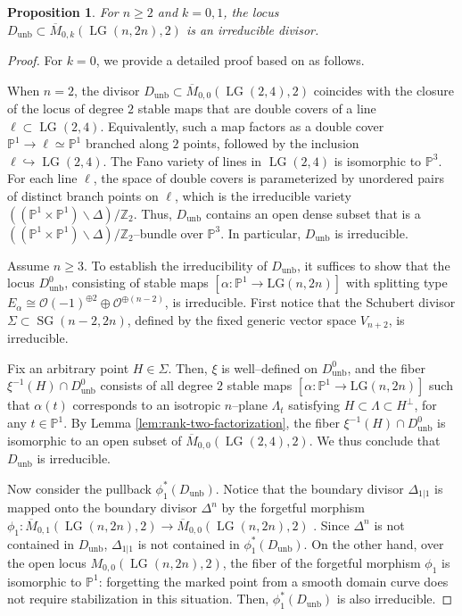 \documentclass[10pt]{amsart}
\newtheorem{proposition}[theorem]{Proposition}
\theoremstyle{definition}
\newcommand{\Mbar}{\overline{M}}
\newcommand{\LG}{\operatorname{LG}}
\DeclareMathOperator{\unb}{unb}
\newcommand{\PP}{\mathbb{P}}
\theoremstyle{plain} %
\begin{document}
\begin{proposition}\label{prop:Dunb-divisor}
For \(n\ge 2\) and $k=0,1$, the locus \(D_{\unb}\subset \overline{M}_{0,k}(\LG(n,2n),2)\) is an irreducible divisor.
\end{proposition}
\begin{proof}
For \(k=0\), we provide a detailed proof based on  \cite[Section~6]{CM} as follows.



When \(n=2\), the divisor \(D_{\unb}\subset \overline{M}_{0,0}(\LG(2,4),2)\) coincides with the
closure of the locus of degree \(2\) stable maps that are double covers of a line
\(\ell\subset \LG(2,4)\). Equivalently, such a map factors as a double cover
\(\mathbb P^1\to \ell\simeq \mathbb P^1\) branched along $2$ points, followed by the inclusion \(\ell\hookrightarrow \LG(2,4)\). The Fano variety of lines in  $\LG(2,4)$ is isomorphic to $\mathbb P^3$. 
For each line $\ell$,
the space of double covers is parameterized by unordered pairs of distinct branch points on $\ell$, which is the irreducible variety 
$((\mathbb P^1\times\mathbb P^1)\backslash\Delta)/\mathbb Z_2$. Thus, $D_{\unb}$ contains an open dense subset that is a  $((\mathbb P^1\times\mathbb P^1)\backslash\Delta)/\mathbb Z_2$--bundle over $\mathbb P^3$.  In particular, $D_{\unb}$ is irreducible.


Assume $n \geq 3$. To establish the irreducibility of $D_{\unb}$, it suffices to show that the locus $D_{\unb}^0$, consisting of stable maps $[\alpha \colon \mathbb{P}^1 \to \mathrm{LG}(n,2n)]$ with splitting type $E_\alpha \cong \mathcal{O}(-1)^{\oplus 2} \oplus \mathcal{O}^{\oplus (n-2)}$, is irreducible. First notice that the Schubert divisor $\Sigma\subset\operatorname{SG}(n-2, 2n)$, defined by the fixed generic vector space $V_{n+2}$, is irreducible. 

Fix an arbitrary point $H \in \Sigma$. Then, $\xi$ is well--defined on $D_{\unb}^0$, and the fiber $\xi^{-1}(H)\cap D_{\unb}^0$ consists of all degree $2$ stable maps $[\alpha \colon \mathbb{P}^1 \to \mathrm{LG}(n,2n)]$ such that  $\alpha(t)$ corresponds to an isotropic $n$--plane $\Lambda_t$ satisfying $H \subset \Lambda \subset H^\perp$, for any $t\in\PP^1$.
By Lemma \ref{lem:rank-two-factorization}, the fiber $\xi^{-1}(H)\cap D_{\unb}^0$ is isomorphic to an open subset of $\Mbar_{0,0}(\LG(2, 4), 2)$. We thus conclude that $D_{\unb}$ is irreducible.

Now consider the pullback $\phi_1^*(D_{\unb})$. Notice that the boundary divisor $\Delta_{1|1}$ is mapped onto the boundary divisor $\Delta^n$ by the forgetful morphism $\phi_1\colon\overline{M}_{0,1}(\LG(n,2n),2)\rightarrow\overline{M}_{0,0}(\LG(n,2n),2)$ .
Since $\Delta^n$ is not contained in $D_{\unb}$,   $\Delta_{1|1}$ is not contained in $\phi_1^*(D_{\unb})$. On the other hand, over the open locus ${M}_{0,0}(\LG(n,2n),2)$, the fiber of the forgetful morphism 
$\phi_1$ is isomorphic to $\PP^1$: forgetting the marked point from a smooth domain curve does not require stabilization in this situation. Then,  $\phi_1^*(D_{\unb})$ is also irreducible.
\end{proof}
\end{document}

